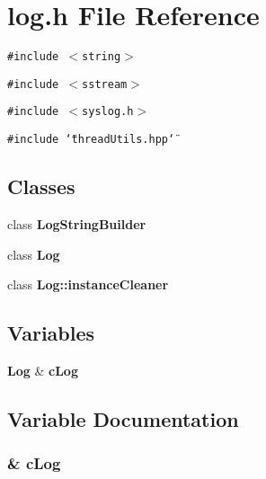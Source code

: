 \section{log.h File Reference}
\label{log_8h}
{\tt \#include $<$string$>$}\par
{\tt \#include $<$sstream$>$}\par
{\tt \#include $<$syslog.h$>$}\par
{\tt \#include \char`\"{}thread\-Utils.hpp\char`\"{}}\par
\subsection*{Classes}
\begin{CompactItemize}
\item 
class {\bf Log\-String\-Builder}
\item 
class {\bf Log}
\item 
class {\bf Log::instance\-Cleaner}
\end{CompactItemize}
\subsection*{Variables}
\begin{CompactItemize}
\item 
{\bf Log} \& {\bf c\-Log}
\end{CompactItemize}


\subsection{Variable Documentation}
\subsubsection{\& {\bf c\-Log}}\label{log_8h_dabafeab912880de79e232735f44ce33}


